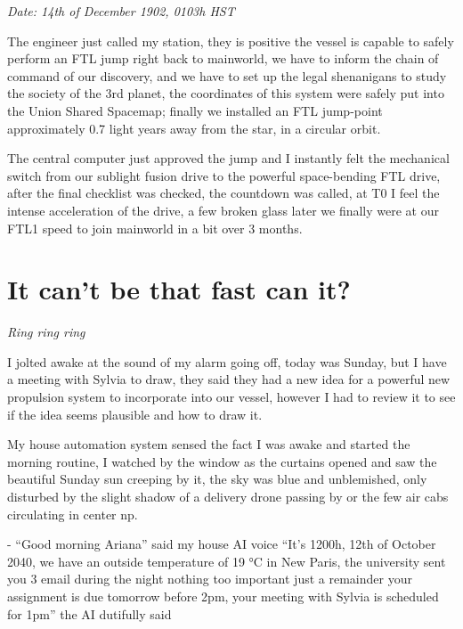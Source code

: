 \documentclass[hidelinks,12pt,a4paper]{book}
\begin{document}
\textit{Date: 14th of December 1902, 0103h HST}\par

The engineer just called my station, 
they is positive the vessel is capable to safely perform an FTL jump right back to mainworld, 
we have to inform the chain of command of our discovery, and we have to set up the legal shenanigans 
to study the society of the 3rd planet, the coordinates of this system were safely put into the Union Shared Spacemap;
finally we installed an FTL jump-point approximately 0.7 light years away from the star, in a circular orbit.\par
\bigskip

The central computer just approved the jump and I instantly felt the mechanical switch 
from our sublight fusion drive to the powerful space-bending FTL drive, 
after the final checklist was checked, the countdown was called, at T0 I feel the intense acceleration of the drive, 
a few broken glass later we finally were at our FTL1 speed to join mainworld in a bit over 3 months.\par


\chapter{It can't be that fast can it?}

\textit{Ring ring ring}\par
I jolted awake at the sound of my alarm going off, 
today was Sunday, but I have a meeting with Sylvia to draw, 
they said they had a new idea for a powerful new propulsion system to incorporate into our vessel, however 
I had to review it to see if the idea seems plausible and how to draw it.\par
\bigskip
My house automation system sensed the fact I was awake and 
started the morning routine, I watched by the window as the curtains opened and 
saw the beautiful Sunday sun creeping by it, the sky was blue and unblemished, only disturbed by the 
slight shadow of a delivery drone passing by or the few air cabs circulating in center \gls{np}.\par
\bigskip
- “Good morning Ariana” said my house AI voice\newline
“It's 1200h, 12th of October 2040, we have an outside temperature of 19 °C in New Paris, 
the university sent you 3 email during the night nothing too important just a remainder your 
assignment is due tomorrow before 2pm, your meeting with Sylvia is scheduled for 1pm” the AI dutifully said\par
\bigskip
\end{document}
